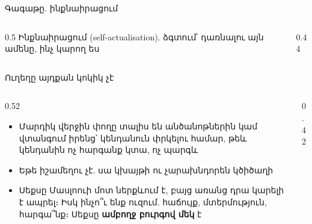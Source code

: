 \begin{frame}{Գագաթը. ինքնաիրացում}
  \begin{columns}[c]
    \begin{column}{0.5\textwidth}
      {\small Ինքնաիրացում (self-actualisation). ձգտում՝ դառնալու այն ամենը, ինչ կարող ես}\par\medskip
    \end{column}
    \begin{column}{0.44\textwidth}
      \centering
    \end{column}
  \end{columns}
\end{frame}

\begin{frame}{Ուղեղը այդքան կոկիկ չէ}
  \begin{columns}[T]
    \begin{column}{0.52\textwidth}
      \begin{itemize}
        \item Մարդիկ վերջին փողը տալիս են անծանոթներին կամ վտանգում իրենց՝ կենդանուն փրկելու համար, թեև կենդանին ոչ հարգանք կտա, ոչ պարգև
        \item<2-> Եթե իշամեղու չէ. սա կխայթի ու չարախնդորեն կծիծաղի 
        \item<3-> Սեքսը Մասլոուի մոտ ներքևում է, բայց առանց դրա կարելի է ապրել։ Իսկ ինչո՞ւ ենք ուզում. հաճույք, մտերմություն, հարգա՞նք։ Սեքսը \textbf{ամբողջ բուրգով մեկ} է
      \end{itemize}
    \end{column}
    \begin{column}{0.42\textwidth}
    \end{column}
  \end{columns}
\end{frame}

